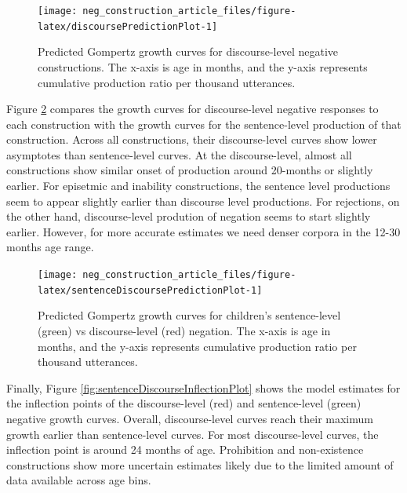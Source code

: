 \documentclass[
  man,floatsintext]{apa6}
\begin{document}
\begin{figure}[H]

{\centering \texttt{[image: neg\_construction\_article\_files/figure-latex/discoursePredictionPlot-1]} 

}

\caption{Predicted Gompertz growth curves for discourse-level negative constructions. The x-axis is age in months, and the y-axis represents cumulative production ratio per thousand utterances.}\label{fig:discoursePredictionPlot}
\end{figure}

Figure \ref{fig:sentenceDiscoursePredictionPlot} compares the growth curves for discourse-level negative responses to each construction with the growth curves for the sentence-level production of that construction. Across all constructions, their discourse-level curves show lower asymptotes than sentence-level curves. At the discourse-level, almost all constructions show similar onset of production around 20-months or slightly earlier. For episetmic and inability constructions, the sentence level productions seem to appear slightly earlier than discourse level productions. For rejections, on the other hand, discourse-level prodution of negation seems to start slightly earlier. However, for more accurate estimates we need denser corpora in the 12-30 months age range.

\begin{figure}[H]

{\centering \texttt{[image: neg\_construction\_article\_files/figure-latex/sentenceDiscoursePredictionPlot-1]} 

}

\caption{Predicted Gompertz growth curves for children's sentence-level (green) vs discourse-level (red) negation. The x-axis is age in months, and the y-axis represents cumulative production ratio per thousand utterances.}\label{fig:sentenceDiscoursePredictionPlot}
\end{figure}

Finally, Figure \ref{fig:sentenceDiscourseInflectionPlot} shows the model estimates for the inflection points of the discourse-level (red) and sentence-level (green) negative growth curves. Overall, discourse-level curves reach their maximum growth earlier than sentence-level curves. For most discourse-level curves, the inflection point is around 24 months of age. Prohibition and non-existence constructions show more uncertain estimates likely due to the limited amount of data available across age bins.
\end{document}
